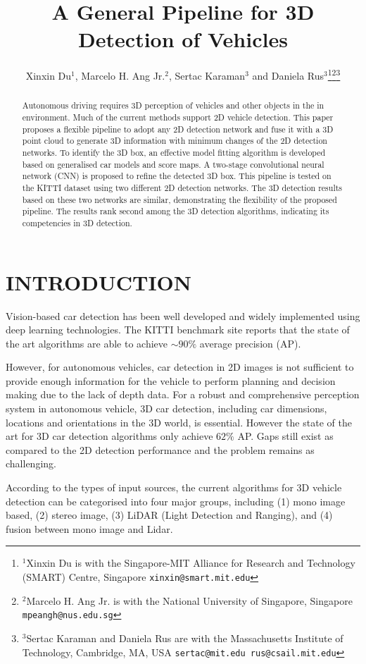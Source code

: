 \documentclass[letterpaper, 10 pt, conference]{ieeeconf}  \usepackage[
\title{\LARGE \bf
A General Pipeline for 3D Detection of Vehicles
}
\author{Xinxin Du$^{1}$, Marcelo H. Ang Jr.$^{2}$, Sertac Karaman$^{3}$ and Daniela Rus$^{3}$\thanks{$^{1}$Xinxin Du is with the Singapore-MIT Alliance for Research and Technology (SMART) Centre, Singapore {\tt\small xinxin@smart.mit.edu}}\thanks{$^{2}$Marcelo H. Ang Jr. is with the National University of Singapore, Singapore {\tt\small mpeangh@nus.edu.sg}}\thanks{$^{3}$Sertac Karaman and Daniela Rus are with the Massachusetts Institute of Technology, Cambridge, MA, USA {\tt\small sertac@mit.edu rus@csail.mit.edu}}}
\begin{document}
\maketitle



\begin{abstract}
Autonomous driving requires 3D perception of vehicles and other objects in the in environment. Much of the current methods support 2D vehicle detection. This paper proposes a flexible pipeline to adopt any 2D detection network and fuse it with a 3D point cloud to generate 3D information with minimum changes of the 2D detection networks. To identify the 3D box, an effective model fitting algorithm is developed based on generalised car models and score maps. A two-stage convolutional neural network (CNN) is proposed to refine the detected 3D box. This pipeline is tested on the KITTI dataset using two different 2D detection networks. The 3D detection results based on these two networks are similar, demonstrating the flexibility of the proposed pipeline. The results rank second among the 3D detection algorithms, indicating its competencies in 3D detection. 
\end{abstract}


\section{INTRODUCTION}
\label{sec:Introduction}
Vision-based car detection has been well developed and widely implemented using deep learning technologies. The KITTI  \cite{Geiger2012CVPR} benchmark site reports that the state of the art algorithms are able to achieve $\sim 90\%$ average precision (AP). 

However, for autonomous vehicles, car detection in 2D images is not sufficient to provide enough information for the vehicle to perform planning and decision making due to the lack of depth data. For a robust and comprehensive perception system in autonomous vehicle, 3D car detection, including car dimensions, locations and orientations in the 3D world, is essential. However the state of the art for 3D car detection algorithms only achieve $62\%$ AP. Gaps still exist as compared to the 2D detection performance and the problem remains as challenging.

According to the types of input sources, the current algorithms for 3D vehicle detection can be categorised into four major groups, including (1) mono image based, (2) stereo image, (3) LiDAR (Light Detection and Ranging), and (4) fusion between mono image and Lidar.
\end{document}
